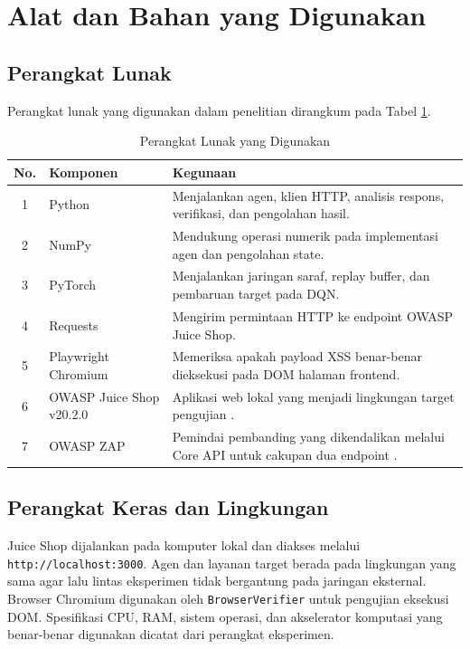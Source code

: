 \section{Alat dan Bahan yang Digunakan}

\subsection{Perangkat Lunak}

Perangkat lunak yang digunakan dalam penelitian dirangkum pada Tabel \ref{tab:perangkat_lunak}.

\begin{table}[H]
\centering
\caption{Perangkat Lunak yang Digunakan}
\label{tab:perangkat_lunak}
\begin{tabular}{|c|p{3.3cm}|p{8.4cm}|}
\hline
\textbf{No.} & \textbf{Komponen} & \textbf{Kegunaan} \\ \hline
1 & Python & Menjalankan agen, klien HTTP, analisis respons, verifikasi, dan pengolahan hasil. \\ \hline
2 & NumPy & Mendukung operasi numerik pada implementasi agen dan pengolahan state. \\ \hline
3 & PyTorch & Menjalankan jaringan saraf, replay buffer, dan pembaruan target pada DQN. \\ \hline
4 & Requests & Mengirim permintaan HTTP ke endpoint OWASP Juice Shop. \\ \hline
5 & Playwright Chromium & Memeriksa apakah payload XSS benar-benar dieksekusi pada DOM halaman frontend. \\ \hline
6 & OWASP Juice Shop v20.2.0 & Aplikasi web lokal yang menjadi lingkungan target pengujian \cite{owaspJuiceShop}. \\ \hline
7 & OWASP ZAP & Pemindai pembanding yang dikendalikan melalui Core API untuk cakupan dua endpoint \cite{owaspZapApi}. \\ \hline
\end{tabular}
\end{table}

\subsection{Perangkat Keras dan Lingkungan}

Juice Shop dijalankan pada komputer lokal dan diakses melalui \texttt{http://localhost:3000}. Agen dan layanan target berada pada lingkungan yang sama agar lalu lintas eksperimen tidak bergantung pada jaringan eksternal. Browser Chromium digunakan oleh \texttt{BrowserVerifier} untuk pengujian eksekusi DOM. Spesifikasi CPU, RAM, sistem operasi, dan akselerator komputasi yang benar-benar digunakan dicatat dari perangkat eksperimen.

